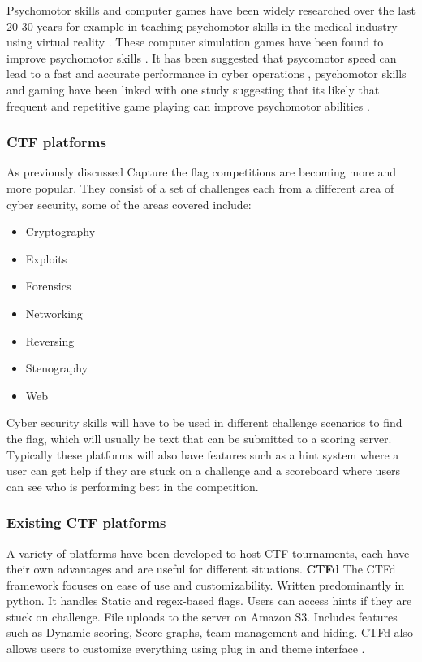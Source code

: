 \documentclass[12pt,a4paper]{article}
\begin{document}
Psychomotor skills and computer games have been widely researched over the last 20-30 years for example in teaching psychomotor skills in the medical industry using virtual reality \cite{westwood1998validation} \cite{gallagher2001objective} \cite{gallagher2002virtual} \cite{grantcharov2004randomized} \cite{lehmann2005prospective}. These computer simulation games have been found to improve psychomotor skills \cite{mitchell2004use}. It has been suggested that psycomotor speed can lead to a fast and accurate performance in cyber operations \cite{campbell2015identifying}, psychomotor skills and gaming have been linked with one study suggesting that its likely that frequent and repetitive game playing can improve psychomotor abilities \cite{kennedy2011video}.



\subsubsection{CTF platforms}
As previously discussed Capture the flag competitions are becoming more and more popular. They consist of a set of challenges each from a different area of cyber security, some of the areas covered include: 
\begin{itemize}
  \item Cryptography
  \item Exploits 
  \item Forensics 
  \item Networking 
  \item Reversing 
  \item Stenography  
  \item Web
\end{itemize}
Cyber security skills will have to be used in different challenge scenarios to find the flag, which will usually be text that can be submitted to a scoring server\cite{burket2015automatic}. Typically these platforms will also have features such as a hint system where a user can get help if they are stuck on a challenge and a scoreboard where users can see who is performing best in the competition.   

\subsubsection{Existing CTF platforms}  
A variety of platforms have been developed to host CTF tournaments, each have their own advantages and are useful for different situations.  
\textbf{CTFd} 
The CTFd framework focuses on ease of use and customizability.  Written predominantly in python. It handles Static and regex-based flags. Users can access hints if they are stuck on challenge. File uploads to the server on Amazon S3. Includes features such as Dynamic scoring, Score graphs, team management and hiding. CTFd also allows users to customize everything using plug in and theme interface \cite{ctfd}.   
\end{document}
